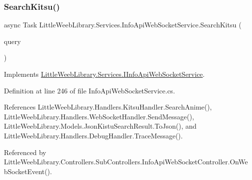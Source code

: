 \subsubsection{\texorpdfstring{Search\+Kitsu()}{SearchKitsu()}}
{\footnotesize\ttfamily async Task Little\+Weeb\+Library.\+Services.\+Info\+Api\+Web\+Socket\+Service.\+Search\+Kitsu (\begin{DoxyParamCaption}\item[{J\+Object}]{query }\end{DoxyParamCaption})}



Implements \mbox{\hyperlink{interface_little_weeb_library_1_1_services_1_1_i_info_api_web_socket_service_ac75ad408fb83a3e0a2d2dc1272dfa355}{Little\+Weeb\+Library.\+Services.\+I\+Info\+Api\+Web\+Socket\+Service}}.



Definition at line 246 of file Info\+Api\+Web\+Socket\+Service.\+cs.



References Little\+Weeb\+Library.\+Handlers.\+Kitsu\+Handler.\+Search\+Anime(), Little\+Weeb\+Library.\+Handlers.\+Web\+Socket\+Handler.\+Send\+Message(), Little\+Weeb\+Library.\+Models.\+Json\+Kistu\+Search\+Result.\+To\+Json(), and Little\+Weeb\+Library.\+Handlers.\+Debug\+Handler.\+Trace\+Message().



Referenced by Little\+Weeb\+Library.\+Controllers.\+Sub\+Controllers.\+Info\+Api\+Web\+Socket\+Controller.\+On\+Web\+Socket\+Event().


